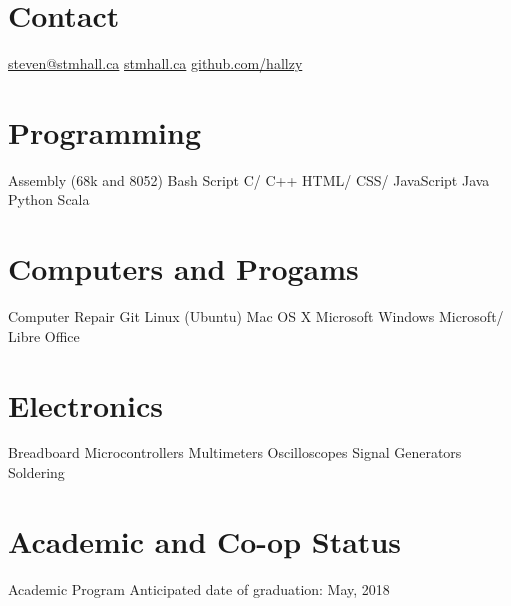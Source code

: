 \documentclass[]{friggeri-cv} %
\begin{document}


\begin{aside} %
\section{Contact}
\href{mailto:steven@stmhall.ca}{steven@stmhall.ca}
\href{http://stmhall.ca}{stmhall.ca}
\href{http://github.com/hallzy}{github.com/hallzy}
\section{Programming}
Assembly (68k and 8052)
Bash Script
C/ C++
HTML/ CSS/ JavaScript
Java
Python
Scala
\section{Computers and Progams}
Computer Repair
Git
Linux (Ubuntu)
Mac OS X
Microsoft Windows
Microsoft/ Libre Office
\section{Electronics}
Breadboard
Microcontrollers
Multimeters
Oscilloscopes
Signal Generators
Soldering
\end{aside}

\section{Academic and Co-op Status}

\begin{entrylist}

\entry
{}
{Academic Program}
{}
{
Anticipated date of graduation: May, 2018
}
\end{entrylist}

\end{document}
